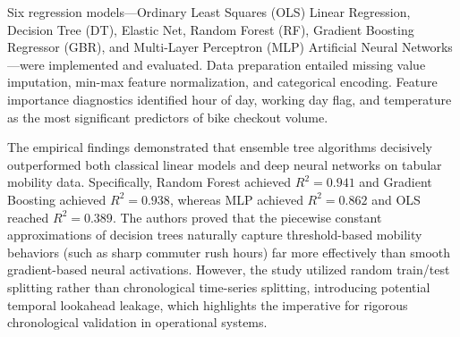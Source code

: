 \documentclass[12pt, a4paper]{article}
\renewcommand{\_}{\textunderscore\allowbreak}
\begin{document}
Six regression models---Ordinary Least Squares (OLS) Linear Regression, Decision Tree (DT), Elastic Net, Random Forest (RF), Gradient Boosting Regressor (GBR), and Multi-Layer Perceptron (MLP) Artificial Neural Networks---were implemented and evaluated. Data preparation entailed missing value imputation, min-max feature normalization, and categorical encoding. Feature importance diagnostics identified hour of day, working day flag, and temperature as the most significant predictors of bike checkout volume.

The empirical findings demonstrated that ensemble tree algorithms decisively outperformed both classical linear models and deep neural networks on tabular mobility data. Specifically, Random Forest achieved $R^2 = 0.941$ and Gradient Boosting achieved $R^2 = 0.938$, whereas MLP achieved $R^2 = 0.862$ and OLS reached $R^2 = 0.389$. The authors proved that the piecewise constant approximations of decision trees naturally capture threshold-based mobility behaviors (such as sharp commuter rush hours) far more effectively than smooth gradient-based neural activations. However, the study utilized random train/test splitting rather than chronological time-series splitting, introducing potential temporal lookahead leakage, which highlights the imperative for rigorous chronological validation in operational systems.
\end{document}
